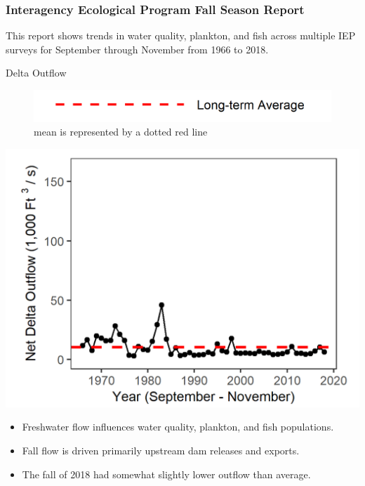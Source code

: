 \documentclass[
]{book}
\providecommand{\tightlist}{%
  \setlength{\itemsep}{0pt}\setlength{\parskip}{0pt}}
\begin{document}
\hypertarget{interagency-ecological-program-fall-season-report}{%
\subsubsection{Interagency Ecological Program Fall Season Report}\label{interagency-ecological-program-fall-season-report}}

This report shows trends in water quality, plankton, and fish across multiple IEP
surveys for September through November from 1966 to 2018.

Delta Outflow

\begin{figure}
\includegraphics[width=15.25in]{figures/mline} \caption{mean is represented by a dotted red line}\label{fig:unnamed-chunk-92}
\end{figure}

\includegraphics[width=15.25in]{figures/fall_outflow_update}

\begin{itemize}
\tightlist
\item
  Freshwater flow influences water quality, plankton, and fish populations.
\item
  Fall flow is driven primarily upstream dam releases and exports.
\item
  The fall of 2018 had somewhat slightly lower outflow than average.
\end{itemize}
\end{document}
